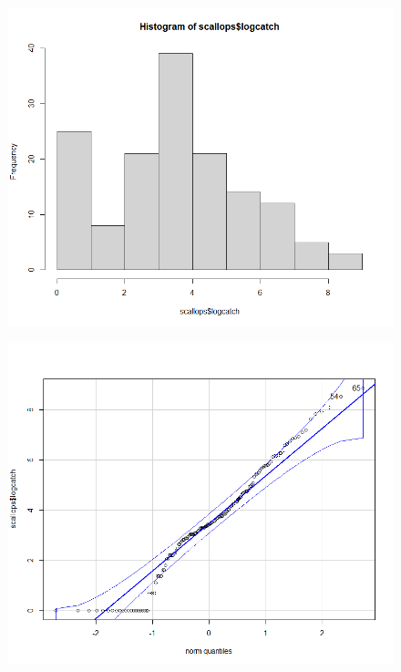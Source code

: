 \documentclass[12pt]{article}
\makeatletter
\theoremstyle{homework}
\newenvironment{exercise}[1]
{\def\@currentlabel{#1}\exercisecore}
{\endexercisecore}
\makeatother
\begin{document}
\begin{exercise}{2}
\begin{enumerate}
  \begin{figure}[H]
    \begin{center}
    \includegraphics[width = .70\textwidth]{Rplot02.png}
    \end{center}
  \end{figure}
  \begin{figure}[H]
    \begin{center}
    \includegraphics[width = .70\textwidth]{Rplot03.png}
    \end{center}
  \end{figure}

  \vspace{.15in}




  
  
  

\end{enumerate}
\end{exercise}
\end{document}
